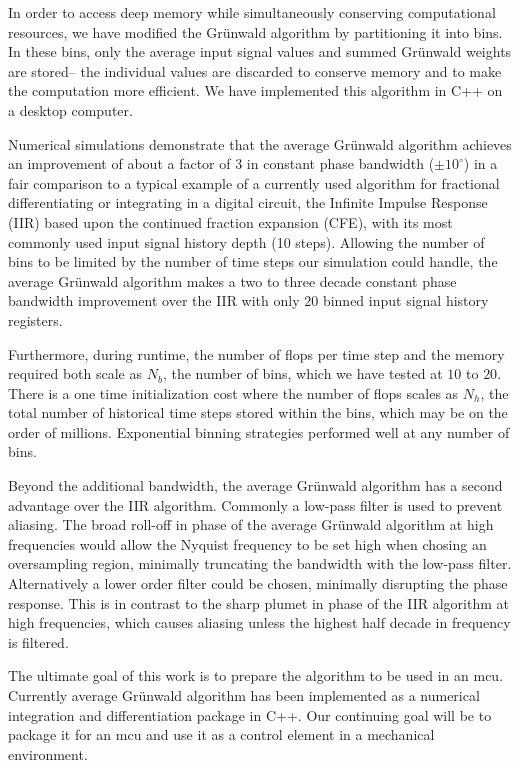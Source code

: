 In order to access deep memory while simultaneously conserving computational resources, we have modified the Gr{\"u}nwald algorithm by partitioning it into bins. In these bins, only the average input signal values and summed Gr{\"u}nwald weights are stored-- the individual values are discarded to conserve memory and to make the computation more efficient. We have implemented this algorithm in C++ on a desktop computer. 

Numerical simulations demonstrate that the average Gr{\"u}nwald algorithm achieves an improvement of about a factor of $3$ in constant phase bandwidth ($\pm 10^\circ$) in a fair comparison to a typical example of a currently used algorithm for fractional differentiating or integrating in a digital circuit, the Infinite Impulse Response (IIR) based upon the continued fraction expansion (CFE), with its most commonly used input signal history depth (10 steps). Allowing the number of bins to be limited by the number of time steps our simulation could handle, the average Gr{\"u}nwald algorithm makes a two to three decade constant phase bandwidth improvement over the IIR with only $20$ binned input signal history registers. 

Furthermore, during runtime, the number of flops per time step and the memory required both scale as $N_b$, the number of bins, which we have tested at $10$ to $20$. There is a one time initialization cost where the number of flops scales as $N_h$, the total number of historical time steps stored within the bins, which may be on the order of millions. Exponential binning strategies performed well at any number of bins. 

Beyond the additional bandwidth, the average Gr{\"u}nwald algorithm has a second advantage over the IIR algorithm. Commonly a low-pass filter is used to prevent aliasing. The broad roll-off  in phase of the average Gr{\"u}nwald algorithm at high frequencies would allow the Nyquist frequency to be set high when chosing an oversampling region, minimally truncating the bandwidth with the low-pass filter. Alternatively a lower order filter could be chosen, minimally disrupting the phase response. This is in contrast to the sharp plumet in phase of the IIR algorithm at high frequencies, which causes aliasing unless the highest half decade in frequency is filtered.

The ultimate goal of this work is to prepare the algorithm to be used in an mcu. Currently average Gr{\"u}nwald algorithm has been implemented as a numerical integration and differentiation package in C++. Our continuing goal will be to package it for an mcu and use it as a control element in a mechanical environment. 

